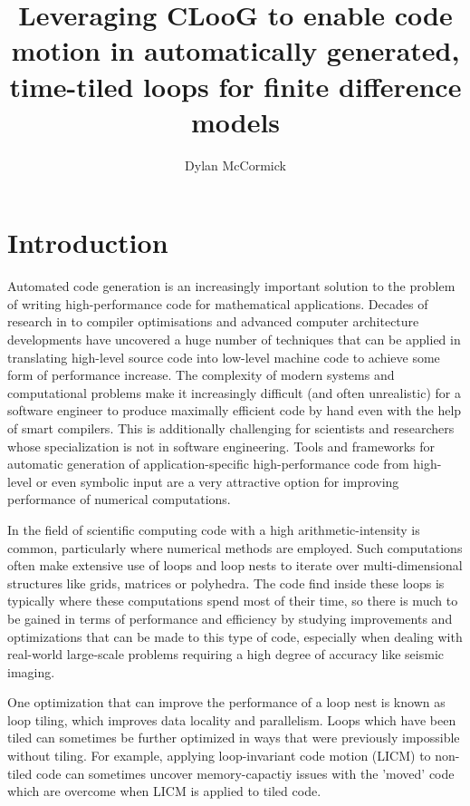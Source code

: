 \documentclass[a4paper,12pt,twoside]{report}
\title{Leveraging CLooG to enable code motion in automatically generated, time-tiled loops for finite difference models}
\author{Dylan McCormick}
\begin{document}
\maketitle

\tableofcontents

\begin{abstract}
\end{abstract}

\chapter{Introduction}
Automated code generation is an increasingly important solution to the problem of writing high-performance code
for mathematical applications. Decades of research in to compiler optimisations and advanced computer architecture developments
have uncovered a huge number of techniques that can be applied in translating high-level source code into low-level machine code
to achieve some form of performance increase. The complexity of modern systems and computational problems make it increasingly 
difficult (and often unrealistic) for a software engineer to produce maximally efficient code by hand even with the help of smart
compilers. This is additionally challenging for scientists and researchers whose specialization is not in software engineering. Tools
and frameworks for automatic generation of application-specific high-performance code from high-level or even symbolic input are a very
attractive option for improving performance of numerical computations.

In the field of scientific computing code with a high arithmetic-intensity is common, particularly where numerical methods are employed.
Such computations often make extensive use of loops and loop nests to iterate over multi-dimensional structures like grids, matrices or
polyhedra. The code find inside these loops is typically where these computations spend most of their time, so there is much to be gained
in terms of performance and efficiency by studying improvements and optimizations that can be made to this type of code, especially when dealing
with real-world large-scale problems requiring a high degree of accuracy like seismic imaging.

One optimization that can improve the performance of a loop nest is known as loop tiling, which improves data locality and parallelism.
Loops which have been tiled can sometimes be further optimized in ways that were previously impossible without tiling. For example, 
applying loop-invariant code motion (LICM) to non-tiled code can sometimes uncover memory-capactiy issues with the 'moved' code which are
overcome when LICM is applied to tiled code.
\end{document}
